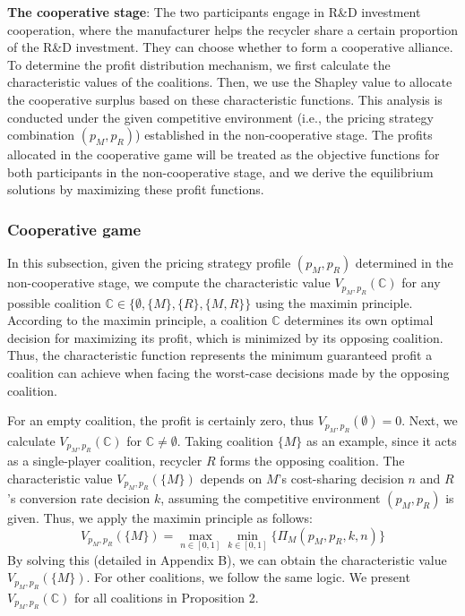 \documentclass[authoryear,preprint,review,times,10pt]{elsarticle}
\begin{document}
\textbf{The cooperative stage}: The two participants engage in R\&D investment cooperation, where the manufacturer helps the recycler share a certain proportion of the R\&D investment. They can choose whether to form a cooperative alliance. To determine the profit distribution mechanism, we first calculate the characteristic values of the coalitions. Then, we use the Shapley value to allocate the cooperative surplus based on these characteristic functions. This analysis is conducted under the given competitive environment (i.e., the pricing strategy combination $(p_M, p_R)$) established in the non-cooperative stage. The profits allocated in the cooperative game will be treated as the objective functions for both participants in the non-cooperative stage, and we derive the equilibrium solutions by maximizing these profit functions.

\subsubsection{Cooperative game}
\label{sec:cooperative_game}

In this subsection, given the pricing strategy profile $(p_M, p_R)$ determined in the non-cooperative stage, we compute the characteristic value $V_{p_M,p_R}(\mathbb{C})$ for any possible coalition $\mathbb{C} \in \{\emptyset, \{M\}, \{R\}, \{M,R\}\}$ using the maximin principle. According to the maximin principle, a coalition $\mathbb{C}$ determines its own optimal decision for maximizing its profit, which is minimized by its opposing coalition. Thus, the characteristic function represents the minimum guaranteed profit a coalition can achieve when facing the worst-case decisions made by the opposing coalition.

For an empty coalition, the profit is certainly zero, thus $V_{p_M,p_R}(\emptyset) = 0$. Next, we calculate $V_{p_M,p_R}(\mathbb{C})$ for $\mathbb{C} \neq \emptyset$. Taking coalition $\{M\}$ as an example, since it acts as a single-player coalition, recycler $R$ forms the opposing coalition. The characteristic value $V_{p_M,p_R}(\{M\})$ depends on $M$'s cost-sharing decision $n$ and $R$'s conversion rate decision $k$, assuming the competitive environment $(p_M, p_R)$ is given. Thus, we apply the maximin principle as follows:
\begin{equation}
V_{p_M,p_R}(\{M\}) = \max_{n \in [0,1]} \min_{k \in [0,1]} \{\Pi_M(p_M, p_R, k, n)\}
\end{equation}
By solving this (detailed in Appendix B), we can obtain the characteristic value $V_{p_M,p_R}(\{M\})$. For other coalitions, we follow the same logic. We present $V_{p_M,p_R}(\mathbb{C})$ for all coalitions in Proposition 2.
\end{document}
